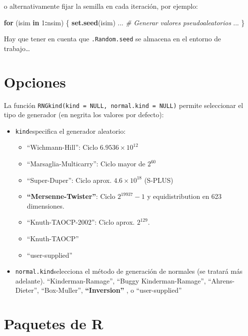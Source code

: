 \documentclass[
]{book}
\newenvironment{Shaded}{\begin{snugshade}}{\end{snugshade}}
\newcommand{\CommentTok}[1]{\textcolor[rgb]{0.56,0.35,0.01}{\textit{#1}}}
\newcommand{\ControlFlowTok}[1]{\textcolor[rgb]{0.13,0.29,0.53}{\textbf{#1}}}
\newcommand{\DecValTok}[1]{\textcolor[rgb]{0.00,0.00,0.81}{#1}}
\newcommand{\KeywordTok}[1]{\textcolor[rgb]{0.13,0.29,0.53}{\textbf{#1}}}
\newcommand{\NormalTok}[1]{#1}
\newcommand{\OperatorTok}[1]{\textcolor[rgb]{0.81,0.36,0.00}{\textbf{#1}}}
\theoremstyle{break}
\theoremstyle{definition}
\theoremstyle{definition}
\theoremstyle{definition}
\theoremstyle{remark}
\begin{document}
o alternativamente fijar la semilla en cada iteración, por ejemplo:

\begin{Shaded}
\begin{Highlighting}[]
\ControlFlowTok{for}\NormalTok{ (isim }\ControlFlowTok{in} \DecValTok{1}\OperatorTok{:}\NormalTok{nsim) \{}
  \KeywordTok{set.seed}\NormalTok{(isim)}
\NormalTok{  ...}
  \CommentTok{# Generar valores pseudoaleatorios}
\NormalTok{  ...}
\NormalTok{\}}
\end{Highlighting}
\end{Shaded}

Hay que tener en cuenta que \texttt{.Random.seed} se almacena en el entorno de trabajo\ldots{}

\hypertarget{opciones}{%
\section{Opciones}\label{opciones}}

La función \texttt{RNGkind(kind\ =\ NULL,\ normal.kind\ =\ NULL)} permite
seleccionar el tipo de generador (en negrita los valores por defecto):

\begin{itemize}
\item
  \texttt{kind}especifica el generador aleatorio:

  \begin{itemize}
  \item
    ``Wichmann-Hill'': Ciclo \(6.9536\times10^{12}\)
  \item
    ``Marsaglia-Multicarry'': Ciclo mayor de \(2^{60}\)
  \item
    ``Super-Duper'': Ciclo aprox. \(4.6\times10^{18}\) (S-PLUS)
  \item
    \textbf{``Mersenne-Twister''}: Ciclo \(2^{19937}-1\) y equidistribution
    en 623 dimensiones.
  \item
    ``Knuth-TAOCP-2002'': Ciclo aprox. \(2^{129}\).
  \item
    ``Knuth-TAOCP''
  \item
    ``user-supplied''
  \end{itemize}
\item
  \texttt{normal.kind}selecciona el método de generación de normales
  (se tratará más adelante).
  ``Kinderman-Ramage'', ``Buggy Kinderman-Ramage'',
  ``Ahrens-Dieter'', ``Box-Muller'', \textbf{``Inversion''} , o ``user-supplied''
\end{itemize}

\hypertarget{paquetes-de-r}{%
\section{Paquetes de R}\label{paquetes-de-r}}
\end{document}
